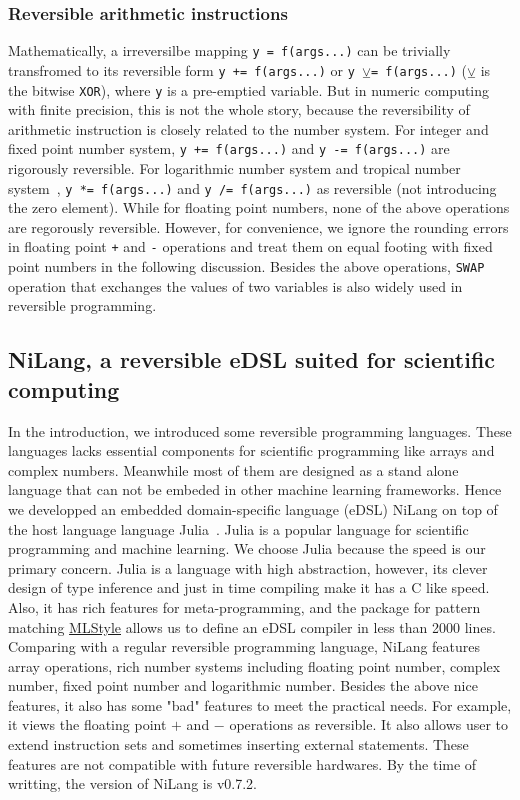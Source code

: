 \documentclass{article}
\newcommand{\<}{\langle}
\renewcommand{\>}{\rangle}
\theoremstyle{definition}\newtheorem{definition}{\textit{Definition}}
\begin{document}
\subsubsection{Reversible arithmetic instructions}
    Mathematically, a irreversilbe mapping \texttt{y = f(args...)} can be trivially transfromed to its reversible form \texttt{y += f(args...)} or \texttt{y $\veebar$= f(args...)} ($\veebar$ is the bitwise \texttt{XOR}), where \texttt{y} is a pre-emptied variable. But in numeric computing with finite precision, this is not the whole story, because the reversibility of arithmetic instruction is closely related to the number system.
    For integer and fixed point number system, \texttt{y += f(args...)} and \texttt{y -= f(args...)} are rigorously reversible. For logarithmic number system and tropical number system~\cite{Speyer2009}, \texttt{y *= f(args...)} and \texttt{y /= f(args...)} as reversible (not introducing the zero element). While for floating point numbers, none of the above operations are regorously reversible. However, for convenience, we ignore the rounding errors in floating point \texttt{+} and \texttt{-} operations and treat them on equal footing with fixed point numbers in the following discussion.
Besides the above operations, \texttt{SWAP} operation that exchanges the values of two variables is also widely used in reversible programming.

\subsection{NiLang, a reversible eDSL suited for scientific computing}
In the introduction, we introduced some reversible programming languages. These languages lacks essential components for scientific programming like arrays and complex numbers. Meanwhile most of them are designed as a stand alone language that can not be embeded in other machine learning frameworks.
Hence we developped an embedded domain-specific language (eDSL) NiLang on top of the host language language Julia~\cite{Bezanson2012,Bezanson2017}.
Julia is a popular language for scientific programming and machine learning. We choose Julia because the speed is our primary concern. Julia is a language with high abstraction, however, its clever design of type inference and just in time compiling make it has a C like speed.
Also, it has rich features for meta-programming, and the package for pattern matching \href{https://github.com/thautwarm/MLStyle.jl}{MLStyle} allows us to define an eDSL compiler in less than 2000 lines.
Comparing with a regular reversible programming language, NiLang features array operations, rich number systems including floating point number, complex number, fixed point number and logarithmic number.
Besides the above nice features, it also has some "bad" features to meet the practical needs. For example, it views the floating point $\mathrel{+}$ and $\mathrel{-}$ operations as reversible. It also allows user to extend instruction sets and sometimes inserting external statements. These features are not compatible with future reversible hardwares.
By the time of writting, the version of NiLang is v0.7.2.
\end{document}
